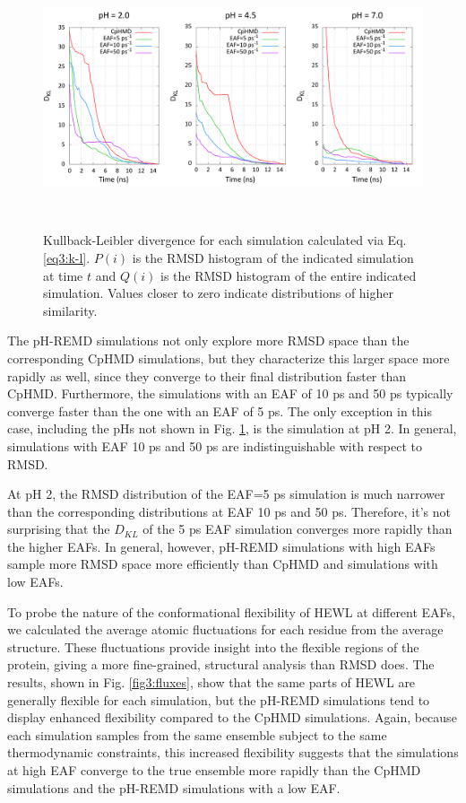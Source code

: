 \begin{figure}
 \includegraphics[width=6.5in, height=3.05in]{Kullback_Leibler.png}
 \caption{Kullback-Leibler divergence for each simulation calculated via Eq.
          \ref{eq3:k-l}.  $P(i)$ is the RMSD histogram of the indicated
          simulation at time $t$ and $Q(i)$ is the RMSD histogram of the entire
          indicated simulation.  Values closer to zero indicate distributions of
          higher similarity.}
 \label{fig3:kullback-leibler}
\end{figure}

The pH-REMD simulations not only explore more RMSD space than the corresponding
CpHMD simulations, but they characterize this larger space more rapidly as well,
since they converge to their final distribution faster than CpHMD.  Furthermore,
the simulations with an EAF of 10 ps and 50 ps typically
converge faster than the one with an EAF of 5 ps.  The only exception
in this case, including the pHs not shown in Fig. \ref{fig3:kullback-leibler},
is the simulation at pH 2.  In general, simulations with EAF 10 ps and
50 ps are indistinguishable with respect to RMSD.

At pH 2, the RMSD distribution of the EAF=5 ps simulation is much
narrower than the corresponding distributions at EAF 10 ps and 50
ps.  Therefore, it's not surprising that the $D_{KL}$ of the 5
ps EAF simulation converges more rapidly than the higher EAFs.  In
general, however, pH-REMD simulations with high EAFs sample more RMSD space more
efficiently than CpHMD and simulations with low EAFs.

To probe the nature of the conformational flexibility of HEWL at different EAFs,
we calculated the average atomic fluctuations for each residue from the average
structure. These fluctuations provide insight into the flexible regions of the
protein, giving a more fine-grained, structural analysis than RMSD does.  The
results, shown in Fig. \ref{fig3:fluxes}, show that the same parts of HEWL are
generally flexible for each simulation, but the pH-REMD simulations tend to
display enhanced flexibility compared to the CpHMD simulations.  Again, because
each simulation samples from the same ensemble subject to the same thermodynamic
constraints, this increased flexibility suggests that the simulations at high
EAF converge to the true ensemble more rapidly than the CpHMD simulations and
the pH-REMD simulations with a low EAF.

